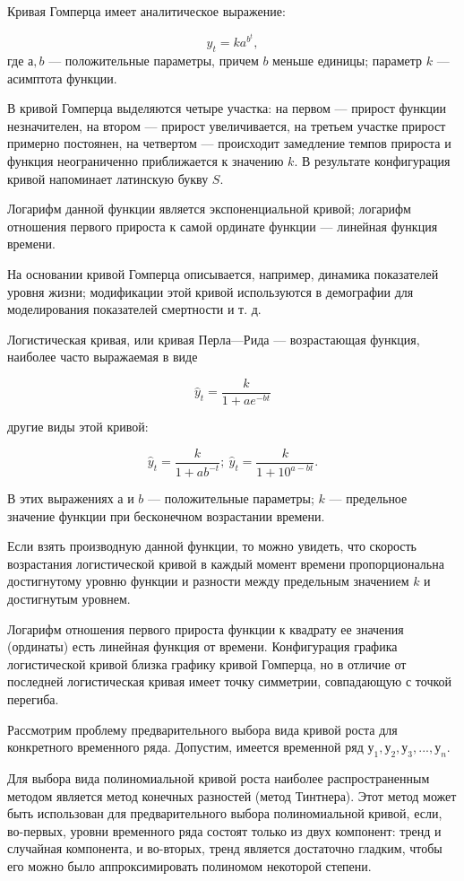Кривая Гомперца имеет аналитическое выражение:

\[ \hat{y}_t = ka^{b^t}, \]
где $а, b$ --- положительные параметры, причем $b$ меньше единицы; параметр $k$ --- асимптота функции.

В кривой Гомперца выделяются четыре участка: на первом --- прирост функции незначителен, на втором --- прирост увеличивается, на третьем участке прирост примерно постоянен, на четвертом --- происходит замедление темпов прироста и функция неограниченно приближается к значению $k$. В результате конфигурация кривой напоминает латинскую букву $S$.

Логарифм данной функции является экспоненциальной кривой; логарифм отношения первого прироста к самой ординате функции --- линейная функция времени.

На основании кривой Гомперца описывается, например, динамика показателей уровня жизни; модификации этой кривой используются в демографии для моделирования показателей смертности и т. д.

Логистическая кривая, или кривая Перла---Рида --- возрастающая функция, наиболее часто выражаемая в виде

\[ \hat{y}_t = \dfrac{k}{1 + ae^{-bt}} \]

другие виды этой кривой:

\[ \hat{y}_t = \dfrac{k}{1 + ab^{-t}};\  \hat{y}_t = \dfrac{k}{1 + 10^{a-bt}}. \]

В этих выражениях $а$ и $b$ --- положительные параметры; $k$ --- предельное значение функции при бесконечном возрастании времени.

Если взять производную данной функции, то можно увидеть, что скорость возрастания логистической кривой в каждый момент времени пропорциональна достигнутому уровню функции и разности между предельным значением $k$ и достигнутым уровнем.

Логарифм отношения первого прироста функции к квадрату ее значения (ординаты) есть линейная функция от времени.
Конфигурация графика логистической кривой близка графику кривой Гомперца, но в отличие от последней логистическая кривая имеет точку симметрии, совпадающую с точкой перегиба.

Рассмотрим проблему предварительного выбора вида кривой роста для конкретного временного ряда. Допустим, имеется временной ряд $у_1,у_2,у_3,...,у_n$.

Для выбора вида полиномиальной кривой роста наиболее распространенным методом является метод конечных разностей (метод Тинтнера). Этот метод может быть использован для предварительного выбора полиномиальной кривой, если, во-первых, уровни временного ряда состоят только из двух компонент: тренд и случайная компонента, и во-вторых, тренд является достаточно гладким, чтобы его можно было аппроксимировать полиномом некоторой степени.

